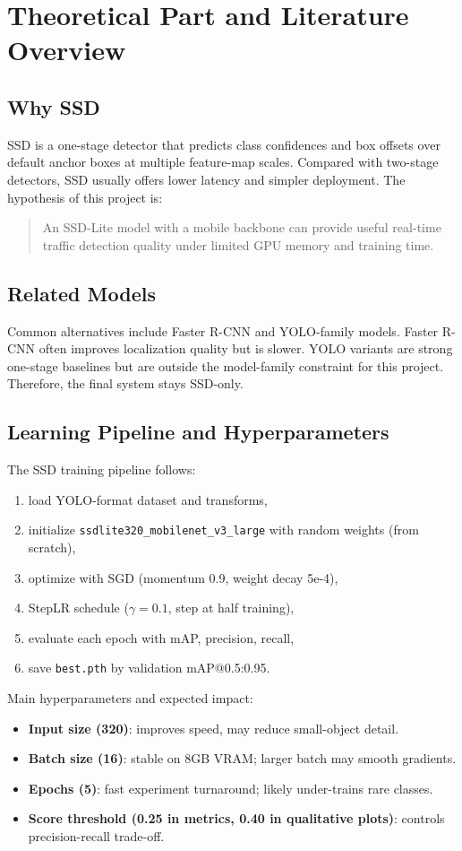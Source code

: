 ﻿\documentclass[11pt]{article}
\begin{document}
\section{Theoretical Part and Literature Overview}
\subsection{Why SSD}
SSD \cite{liu2016ssd} is a one-stage detector that predicts class confidences and box offsets over default anchor boxes at multiple feature-map scales. Compared with two-stage detectors, SSD usually offers lower latency and simpler deployment. The hypothesis of this project is:

\begin{quote}
An SSD-Lite model with a mobile backbone can provide useful real-time traffic detection quality under limited GPU memory and training time.
\end{quote}

\subsection{Related Models}
Common alternatives include Faster R-CNN and YOLO-family models. Faster R-CNN often improves localization quality but is slower. YOLO variants are strong one-stage baselines but are outside the model-family constraint for this project. Therefore, the final system stays SSD-only.

\subsection{Learning Pipeline and Hyperparameters}
The SSD training pipeline follows:
\begin{enumerate}
    \item load YOLO-format dataset and transforms,
    \item initialize \texttt{ssdlite320\_mobilenet\_v3\_large} with random weights (from scratch),
    \item optimize with SGD (momentum 0.9, weight decay 5e-4),
    \item StepLR schedule (\(\gamma=0.1\), step at half training),
    \item evaluate each epoch with mAP, precision, recall,
    \item save \texttt{best.pth} by validation mAP@0.5:0.95.
\end{enumerate}

Main hyperparameters and expected impact:
\begin{itemize}
    \item \textbf{Input size (320)}: improves speed, may reduce small-object detail.
    \item \textbf{Batch size (16)}: stable on 8GB VRAM; larger batch may smooth gradients.
    \item \textbf{Epochs (5)}: fast experiment turnaround; likely under-trains rare classes.
    \item \textbf{Score threshold (0.25 in metrics, 0.40 in qualitative plots)}: controls precision-recall trade-off.
\end{itemize}
\end{document}
